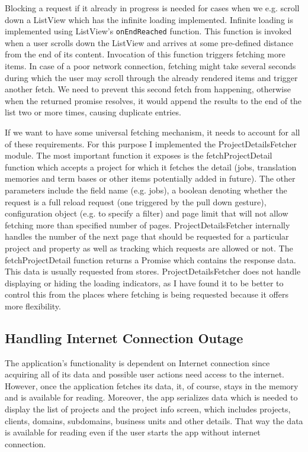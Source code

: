Blocking a request if it already in progress is needed for cases when we e.g. scroll down a ListView which has the infinite loading implemented. Infinite loading is implemented using ListView’s \texttt{onEndReached} function. This function is invoked when a user scrolls down the ListView and arrives at some pre-defined distance from the end of its content. Invocation of this function triggers fetching more items. In case of a poor network connection, fetching might take several seconds during which the user may scroll through the already rendered items and trigger another fetch. We need to prevent this second fetch from happening, otherwise when the returned promise resolves, it would append the results to the end of the list two or more times, causing duplicate entries.
 
If we want to have some universal fetching mechanism, it needs to account for all of these requirements. For this purpose I implemented the ProjectDetailsFetcher module. The most important function it exposes is the fetchProjectDetail function which accepts a project for which it fetches the detail (jobs, translation memories and term bases or other items  potentially added in future). The other parameters include the field name (e.g. jobs), a boolean denoting whether the request is a full reload request (one triggered by the pull down gesture), configuration object (e.g. to specify a filter) and page limit that will not allow fetching more than specified number of pages.
ProjectDetailsFetcher internally handles the number of the next page that should be requested for a particular project and property as well as tracking which requests are allowed or not. The fetchProjectDetail function returns a Promise which contains the response data. This data is usually requested from stores. ProjectDetailsFetcher does not handle displaying or hiding the loading indicators, as I have found it to be better to control this from the places where fetching is being requested because it offers more flexibility.




\subsection{Handling Internet Connection Outage}

The application’s functionality is dependent on Internet connection since acquiring all of its data and possible user actions need access to the internet. However, once the application fetches its data, it, of course, stays in the memory and is available for reading. Moreover, the app serializes data which is needed to display the list of projects and the project info screen, which includes projects, clients, domains, subdomains, business units and other details. That way the data is available for reading even if the user starts the app without internet connection.


